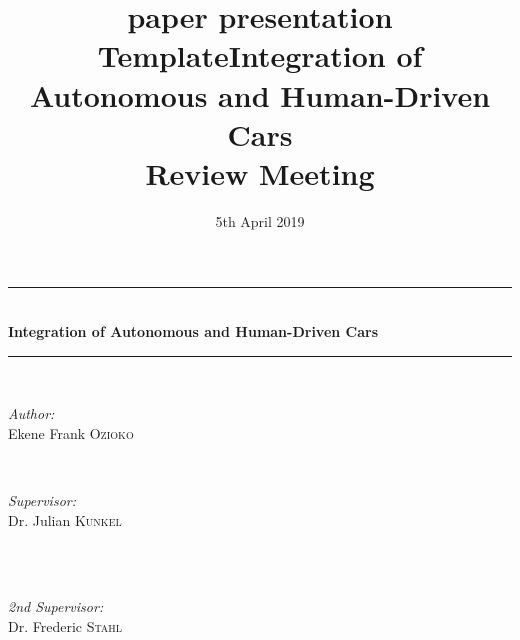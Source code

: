 \documentclass{book}
\title{paper presentation Template}
\date{5th April  2019}
\title{}
\author{}
\begin{document}
\title{\Large Integration of Autonomous and Human-Driven Cars     \\ Review Meeting}




\begin{titlepage}

\newcommand{\HRule}{\rule{\linewidth}{0.5mm}}

\center


\HRule \\[0.4cm]
{ \huge \bfseries Integration of Autonomous and Human-Driven Cars}\\[0.4cm]
\HRule \\[1.5cm]

\begin{minipage}{0.4\textwidth}
\begin{flushleft} \large
\emph{Author:}\\
Ekene Frank \textsc{Ozioko}
\end{flushleft}
\end{minipage}
~
\begin{minipage}{0.4\textwidth}
\begin{flushright} \large
\emph{Supervisor:} \\
Dr. Julian \textsc{Kunkel}
\end{flushright}
\end{minipage}\\[1cm]
~
\begin{minipage}{0.4\textwidth}
\begin{flushright} \large
\emph{2nd Supervisor:} \\
Dr. Frederic \textsc{Stahl}
\end{flushright}
\end{minipage}\\[1cm]


\end{titlepage}
\end{document}
